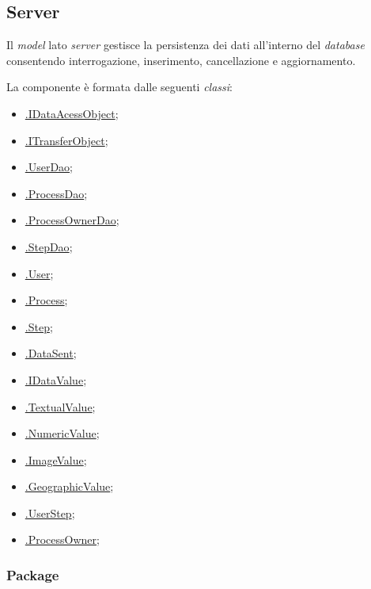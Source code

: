 \subsection{Server}

Il \textit{model} lato \textit{server} gestisce la persistenza dei dati all'interno del \textit{database} consentendo interrogazione, inserimento, cancellazione e aggiornamento.

La componente è formata dalle seguenti \textit{classi}:
\begin{itemize}
	\item \hyperref[idataacessobject]{\smodel{}.IDataAcessObject};
	\item \hyperref[itransferobject]{\smodel{}.ITransferObject};
	\item \hyperref[userdao]{\smodel{}.UserDao};
	\item \hyperref[processdao]{\smodel{}.ProcessDao};
	\item \hyperref[processownerdao]{\smodel{}.ProcessOwnerDao};
	\item \hyperref[stepdao]{\smodel{}.StepDao};
	\item \hyperref[botuser]{\smodel{}.User};
	\item \hyperref[botprocess]{\smodel{}.Process};
	\item \hyperref[botstep]{\smodel{}.Step};
	\item \hyperref[botdatasent]{\smodel{}.DataSent};
	\item \hyperref[botidatavalue]{\smodel{}.IDataValue};
	\item \hyperref[bottextualvalue]{\smodel{}.TextualValue};
	\item \hyperref[botnumericvalue]{\smodel{}.NumericValue};
	\item \hyperref[botimagevalue]{\smodel{}.ImageValue};
	\item \hyperref[botgeographicvalue]{\smodel{}.GeographicValue};
	\item \hyperref[botuserstep]{\smodel{}.UserStep};
	\item \hyperref[botpowner]{\smodel{}.ProcessOwner};
\end{itemize}

\subsubsection{Package \model{}}

